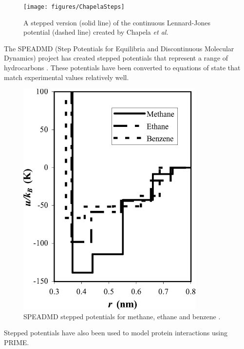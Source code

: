 \documentclass[12pt]{UoAthesis}
\begin{document}
\begin{figure}[htp] 
  \begin{center}
    \texttt{[image: figures/ChapelaSteps]} 
    \caption{\label{fig:chapelasteps} A stepped version (solid line) of the
      continuous Lennard-Jones potential (dashed line) created by Chapela
      \textit{et al.}}
  \end{center}
\end{figure}

The SPEADMD (Step Potentials for Equilibria and Discontinuous
Molecular Dynamics) project has created
stepped potentials that represent a range of hydrocarbons
\cite{ElliotJr2002, Unlu2004, Vahid2010}.  These potentials
have been converted to equations of state that match experimental
values relatively well.

\begin{figure}[htp] 
  \begin{center}
    \includegraphics[clip,scale = 1.2]{figures/SPEADMD} 
    \caption{\label{fig:SPEADMD} SPEADMD stepped potentials for
      methane, ethane and benzene \cite{ElliotJr2002}.}
  \end{center}
\end{figure}

Stepped potentials have also been used to model protein interactions
using PRIME.

%
%
%
\end{document}

